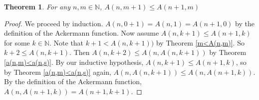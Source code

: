 \documentclass[12pt, letterpaper]{article}
\newtheorem{theorem}{Theorem}
\theoremstyle{case}
\begin{document}
    \begin{theorem}
      \label{a(n,m+1)<=a(n+1,m)}
      For any $n, m \in \mathbb{N}$, $A(n, m + 1) \leq A(n + 1, m)$
    \end{theorem}
    \begin{proof}
      We proceed by induction.
      $A(n, 0 + 1) = A(n, 1) = A(n + 1, 0)$ by the definition of the Ackermann function.
      Now assume $A(n, k + 1) \leq A(n + 1, k)$ for some $k \in \mathbb{N}$.
      Note that $k + 1 < A(n, k + 1))$ by Theorem \ref{m<A(n,m)}.
      So $k + 2 \leq A(n, k + 1)$.
      Then $A(n, k + 2) \leq A(n, A(n, k + 1))$ by Theorem \ref{a(n,m)<a(n,s)}.
      By our inductive hypothesis, $A(n, k + 1) \leq A(n + 1, k)$, so by Theorem \ref{a(n,m)<a(n,s)} again,
      $A(n, A(n, k + 1)) \leq A(n, A(n + 1, k))$.
      By the definition of the Ackermann function, $A(n, A(n + 1, k)) = A(n + 1, k + 1)$.
    \end{proof}
\end{document}
